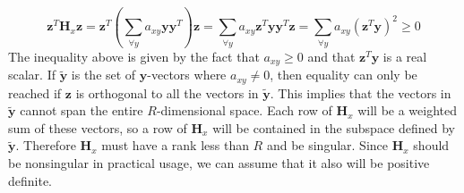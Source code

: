 \begin{equation}
\mathbf{z}^T\mathbf{H}_x\mathbf{z} = \mathbf{z}^T\left(\sum_{\forall y}a_{xy}\mathbf{y}\mathbf{y}^T\right)\mathbf{z} 
= \sum_{\forall y}a_{xy}\mathbf{z}^T\mathbf{y}\mathbf{y}^T\mathbf{z} 
= \sum_{\forall y}a_{xy}\left(\mathbf{z}^T\mathbf{y}\right)^2 \geq 0 
\end{equation}
The inequality above is given by the fact that $a_{xy} \geq 0$ and that $\mathbf{z}^T\mathbf{y}$ is a real scalar. If $\mathbf{\tilde{y}}$ is the set of $\mathbf{y}$-vectors where $a_{xy} \neq 0$, then equality can only be reached if $\mathbf{z}$ is orthogonal to all the vectors in $\mathbf{\tilde{y}}$. This implies that the vectors in $\mathbf{\tilde{y}}$ cannot span the entire $R$-dimensional space. Each row of $\mathbf{H}_x$ will be a weighted sum of these vectors, so a row of $\mathbf{H}_x$ will be contained in the subspace defined by $\mathbf{\tilde{y}}$. Therefore $\mathbf{H}_x$ must have a rank less than $R$ and be singular. Since $\mathbf{H}_x$ should be nonsingular in practical usage, we can assume that it also will be positive definite.  

